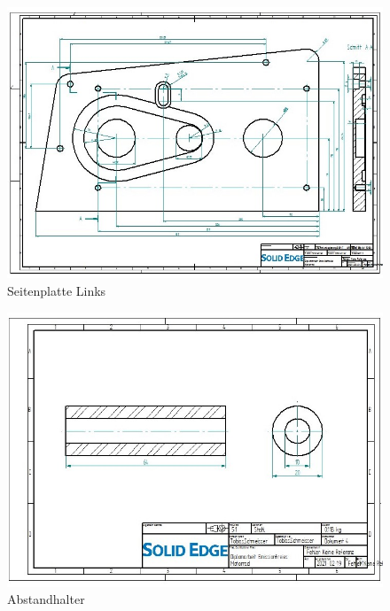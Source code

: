\begin{figure} [H]
	\begin{center}
		\includegraphics[angle=90]{figures/mechanik/Seitenplatte_Fertigung_Links.jpg}
		\caption{Seitenplatte Links}
		\label{fig:Seitenplatte Links}
	\end{center}
\end{figure}

\begin{figure} [H]
	\begin{center}
		\includegraphics[angle=90]{figures/mechanik/Seitenplatte_Abstandhalter_Zeichnung.jpg}
		\caption{Abstandhalter}
		\label{fig:Abstandhalter}
	\end{center}
\end{figure}

